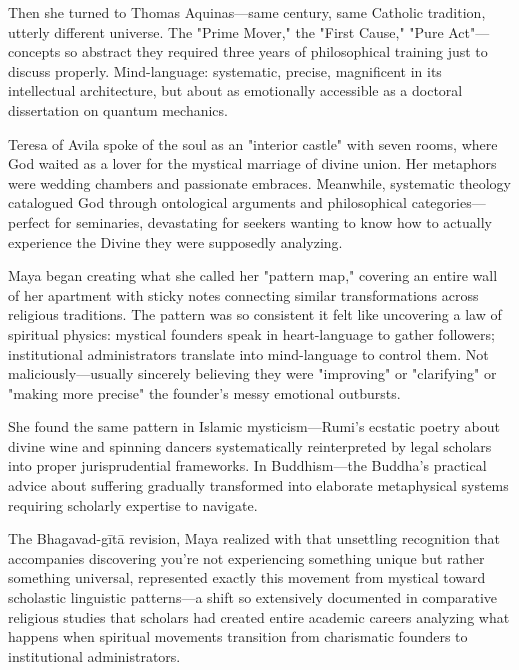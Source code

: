 \documentclass[12pt,twoside]{book}
\begin{document}
Then she turned to Thomas Aquinas—same century, same Catholic tradition, utterly different universe. The "Prime Mover," the "First Cause," "Pure Act"—concepts so abstract they required three years of philosophical training just to discuss properly. Mind-language: systematic, precise, magnificent in its intellectual architecture, but about as emotionally accessible as a doctoral dissertation on quantum mechanics.

Teresa of Avila spoke of the soul as an "interior castle" with seven rooms, where God waited as a lover for the mystical marriage of divine union. Her metaphors were wedding chambers and passionate embraces. Meanwhile, systematic theology catalogued God through ontological arguments and philosophical categories—perfect for seminaries, devastating for seekers wanting to know how to actually experience the Divine they were supposedly analyzing.

Maya began creating what she called her "pattern map," covering an entire wall of her apartment with sticky notes connecting similar transformations across religious traditions. The pattern was so consistent it felt like uncovering a law of spiritual physics: mystical founders speak in heart-language to gather followers; institutional administrators translate into mind-language to control them. Not maliciously—usually sincerely believing they were "improving" or "clarifying" or "making more precise" the founder's messy emotional outbursts.

She found the same pattern in Islamic mysticism—Rumi's ecstatic poetry about divine wine and spinning dancers systematically reinterpreted by legal scholars into proper jurisprudential frameworks. In Buddhism—the Buddha's practical advice about suffering gradually transformed into elaborate metaphysical systems requiring scholarly expertise to navigate.

The Bhagavad-gītā revision, Maya realized with that unsettling recognition that accompanies discovering you're not experiencing something unique but rather something universal, represented exactly this movement from mystical toward scholastic linguistic patterns—a shift so extensively documented in comparative religious studies that scholars had created entire academic careers analyzing what happens when spiritual movements transition from charismatic founders to institutional administrators.
\end{document}
